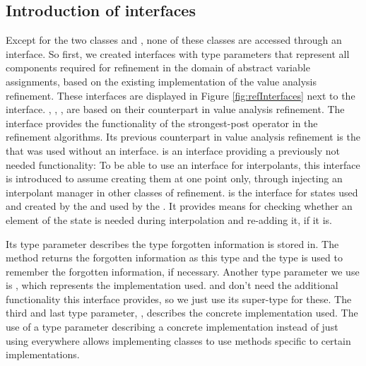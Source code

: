 \subsection{Introduction of interfaces}
Except for the two classes  and , none of these classes are accessed through an interface.
So first, we created interfaces with type parameters that represent all components required for refinement in the domain of abstract variable assignments, based on the existing implementation of the value analysis refinement. These interfaces are displayed in Figure \ref{fig:refInterfaces} next to the  interface.
, , ,  are based on their counterpart in value analysis refinement.
The interface  provides the functionality of the strongest-post operator in the refinement algorithms. Its previous counterpart in value analysis refinement is the  that was used without an interface.
 is an interface providing a previously not needed functionality:
To be able to use an interface for interpolants, this interface is introduced to assume creating them at one point only, through injecting an interpolant manager in other classes of refinement.
 is the interface for states used and created by the  and used by the .
It provides means for checking whether an element of the state is needed during interpolation and re-adding it, if it is.

Its type parameter  describes the type forgotten information is stored in.
The method  returns the forgotten information as this type and the type is used to remember the forgotten information, if necessary.
Another type parameter we use is , which represents the  implementation used.  and  don't need the additional functionality this interface provides,
so we just use its super-type  for these.
The third and last type parameter, , describes the concrete  implementation used.
The use of a type parameter describing a concrete implementation instead of just using  everywhere
allows implementing classes to use methods specific to certain implementations.

